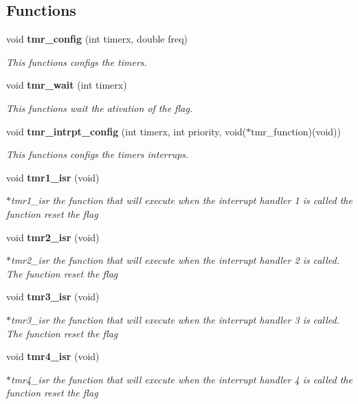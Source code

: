 \subsection*{Functions}
\begin{DoxyCompactItemize}
\item 
void \textbf{ tmr\+\_\+config} (int timerx, double freq)
\begin{DoxyCompactList}\small\item\em This functions configs the timer\textquotesingle{}s. \end{DoxyCompactList}\item 
void \textbf{ tmr\+\_\+wait} (int timerx)
\begin{DoxyCompactList}\small\item\em This functions wait the ativation of the flag. \end{DoxyCompactList}\item 
void \textbf{ tmr\+\_\+intrpt\+\_\+config} (int timerx, int priority, void($\ast$tmr\+\_\+function)(void))
\begin{DoxyCompactList}\small\item\em This functions configs the timer\textquotesingle{}s interrups. \end{DoxyCompactList}\item 
void \textbf{ tmr1\+\_\+isr} (void)
\begin{DoxyCompactList}\small\item\em $\ast$tmr1\+\_\+isr the function that will execute when the interrupt handler 1 is called the function reset the flag \end{DoxyCompactList}\item 
void \textbf{ tmr2\+\_\+isr} (void)
\begin{DoxyCompactList}\small\item\em $\ast$tmr2\+\_\+isr the function that will execute when the interrupt handler 2 is called. The function reset the flag \end{DoxyCompactList}\item 
void \textbf{ tmr3\+\_\+isr} (void)
\begin{DoxyCompactList}\small\item\em $\ast$tmr3\+\_\+isr the function that will execute when the interrupt handler 3 is called. The function reset the flag \end{DoxyCompactList}\item 
void \textbf{ tmr4\+\_\+isr} (void)
\begin{DoxyCompactList}\small\item\em $\ast$tmr4\+\_\+isr the function that will execute when the interrupt handler 4 is called the function reset the flag \end{DoxyCompactList}\item 

\end{DoxyCompactItemize}
